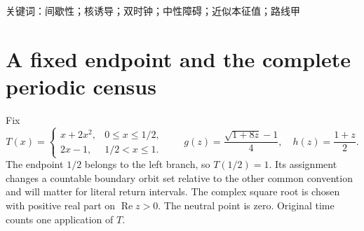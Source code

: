 \documentclass[10pt]{article}
\newcommand{\Rea}{\operatorname{Re}}
\begin{document}
{\cjkfont\noindent 关键词：间歇性；核诱导；双时钟；中性障碍；近似本征值；路线甲}
\fi

\section{A fixed endpoint and the complete periodic census}
Fix
\begin{equation}
T(x)=\begin{cases}x+2x^2,&0\le x\le1/2,\\2x-1,&1/2<x\le1.\end{cases}
\qquad
g(z)=\frac{\sqrt{1+8z}-1}{4},\quad h(z)=\frac{1+z}{2}.
\label{eq:map}
\end{equation}
The endpoint $1/2$ belongs to the left branch, so $T(1/2)=1$.
Its assignment changes a countable boundary orbit set relative to the other
common convention and will matter for literal return intervals. The complex
square root is chosen with positive real part on $\Rea z>0$.
The neutral point is zero. Original time counts one application of $T$.
\end{document}
